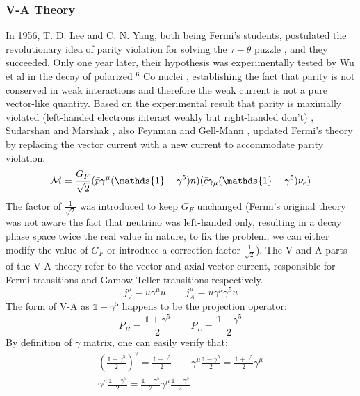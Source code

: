 \subsubsection{V-A Theory}
In 1956, T. D. Lee and C. N. Yang, both being Fermi's students, postulated the
revolutionary idea of parity violation for solving the $\tau-\theta$ puzzle \cite{PhysRev.105.1671}, 
and they succeeded. Only one year later, their hypothesis was experimentally tested
by Wu et al in the decay of polarized ${}^{60}$Co nuclei \cite{PhysRev.105.1413}, 
establishing the fact that parity is not conserved in weak interactions and 
therefore the weak current is not a pure vector-like quantity. 
Based on the experimental result that parity is maximally violated (left-handed 
electrons interact weakly but right-handed don't) \cite{PhysRev.109.1015}, 
Sudarshan and Marshak \cite{PhysRev.109.1860.2}, also Feynman and Gell-Mann \cite{PhysRev.109.193},
updated Fermi's theory by replacing the vector current with a new current to 
accommodate parity violation:
\begin{equation}
    \CM = \frac{G_F}{\sqrt{2}}(\bar{p} \gamma^\mu(\mathds{1} - \gamma^5) n) (\bar{e} \gamma_\mu(\mathds{1} - \gamma^5) \nu_e)
\end{equation}
The factor of $\frac{1}{\sqrt{2}}$ was introduced to keep $G_F$ unchanged (Fermi's
original theory was not aware the fact that neutrino was left-handed only, resulting
in a decay phase space twice the real value in nature, to fix the problem, we can
either modify the value of $G_F$ or introduce a correction factor $\frac{1}{\sqrt{2}}$).
The V and A parts of the V-A theory refer to the vector and axial vector current, 
responsible for Fermi transitions and Gamow-Teller transitions respectively.
\begin{equation}
    j_V^\mu = \bar{u}\gamma^\mu u   \qquad 
    j_A^\mu = \bar{u}\gamma^\mu\gamma^5 u   
\end{equation}
The form of V-A as $\mathds{1} - \gamma^5$ happens to be the projection operator:
\begin{equation}
    P_R = \frac{\mathds{1} + \gamma^5}{2}   \qquad P_L = \frac{\mathds{1} - \gamma^5}{2}
\end{equation}
By definition of $\gamma$ matrix, one can easily verify that:
\begin{equation}
    \begin{gathered}
	\left(\frac{\mathds{1} - \gamma^5}{2} \right)^2 = \frac{\mathds{1} - \gamma^5}{2} 
	\qquad 
	\gamma^\mu \frac{\mathds{1} - \gamma^5}{2} = \frac{\mathds{1} + \gamma^5}{2} \gamma^\mu \\
	\gamma^\mu \frac{\mathds{1} - \gamma^5}{2} = \frac{\mathds{1} + \gamma^5}{2} \gamma^\mu \frac{\mathds{1}-\gamma^5}{2}
    \end{gathered}
\end{equation}
